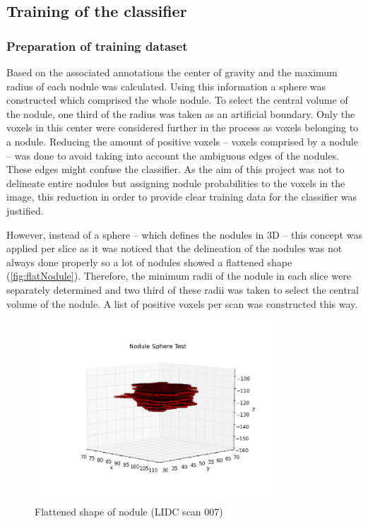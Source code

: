 \subsection{Training of the classifier}
\subsubsection{Preparation of training dataset}
Based on the associated annotations the center of gravity and the maximum radius
of each nodule was calculated. Using this information a sphere was constructed
which comprised the whole nodule. To select the central volume of the nodule,
one third of the radius was taken as an artificial boundary. Only the voxels in
this center were considered further in the process as voxels belonging to a
nodule. Reducing the amount of positive voxels -- voxels comprised by a nodule
-- was done to avoid taking into account the ambiguous edges of the nodules.
These edges might confuse the classifier. As the aim of this project was not to
delineate entire nodules but assigning nodule probabilities to the voxels in
the image, this reduction in order to provide clear training data for the
classifier was justified.

However, instead of a sphere -- which defines the nodules in 3D -- this concept
was applied per slice as it was noticed that the delineation of the nodules was
not always done properly so a lot of nodules showed a flattened shape
(\autoref{fig:flatNodule}).
Therefore, the minimum radii of the nodule in each slice were separately
determined and two third of these radii was taken to select the central volume
of the nodule. A list of positive voxels per scan was constructed this way.
\begin{figure}[htp]
 \begin{center}
    \includegraphics[width=90mm]{img/spherenodule_001.png}
    \caption{Flattened shape of nodule (LIDC scan 007)}
    \label{fig:flatNodule}
 \end{center}
\end{figure} %

